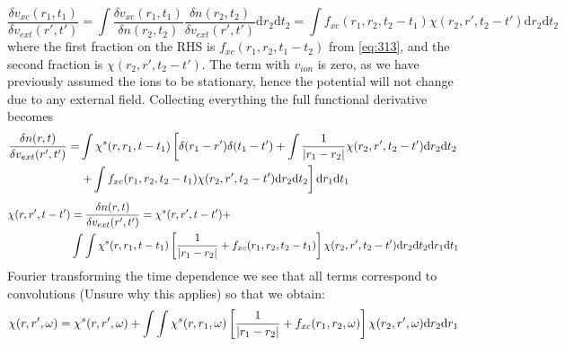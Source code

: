 \begin{solution}
{\begin{equation}
    \dfrac{\delta v_{xc}(r_1,t_1)}{\delta v_{ext}(r',t')} = \int \dfrac{\delta v_{xc}(r_1,t_1)}{\delta n(r_2,t_2)} \dfrac{\delta n(r_2,t_2)}{\delta v_{ext}(r',t')} \mathrm{d}r_2\mathrm{d}t_2 = \int f_{xc}(r_1,r_2,t_2-t_1) \chi(r_2,r',t_2-t') \mathrm{d}r_2\mathrm{d}t_2
\end{equation}}
where the first fraction on the RHS is $f_{xc}(r_1,r_2,t_1-t_2)$ from \eqref{eq:313}, and the second fraction is $\chi(r_2,r',t_2-t')$. The term with $v_{ion}$ is zero, as we have previously assumed the ions to be stationary, hence the potential will not change due to any external field. Collecting everything the full functional derivative becomes
\begin{equation}
\begin{split}
\dfrac{\delta n(r,t)}{\delta v_{ext}(r',t')} 
= & \int \chi^{s}(r,r_1,t-t_1) \left[\delta(r_1-r') \delta(t_1-t') +  \int \dfrac{1}{\abs{r_1 - r_2}}\chi(r_2,r',t_2-t')\mathrm{d}r_2\mathrm{d}t_2  \right.\\ &\left. +  \int f_{xc}(r_1,r_2,t_2-t_1) \chi(r_2,r',t_2-t') \mathrm{d}r_2\mathrm{d}t_2 \right] \mathrm{d}r_1 \mathrm{d}t_1
\end{split}
\end{equation}
{\small
\begin{equation}
    \begin{split}
\chi(r,r',t-t') &= \dfrac{\delta n(r,t)}{\delta v_{ext}(r',t')} 
= \chi^{s}(r,r',t-t')  + \\&\int \int \chi^{s}(r,r_1,t-t_1)\left[\dfrac{1}{\abs{r_1 - r_2}}    +  f_{xc}(r_1,r_2,t_2-t_1) \right]\chi(r_2,r',t_2-t') \mathrm{d}r_2\mathrm{d}t_2\mathrm{d}r_1 \mathrm{d}t_1
\end{split}
\end{equation}}
Fourier transforming the time dependence we see that all terms correspond to convolutions (Unsure why this applies) so that we obtain:
\begin{equation}
    \chi(r,r',\omega) = \chi^{s}(r,r',\omega)  + \int \int \chi^{s}(r,r_1,\omega)\left[\dfrac{1}{\abs{r_1 - r_2}}    +  f_{xc}(r_1,r_2,\omega) \right]\chi(r_2,r',\omega) \mathrm{d}r_2\mathrm{d}r_1
\end{equation}
\end{solution}



